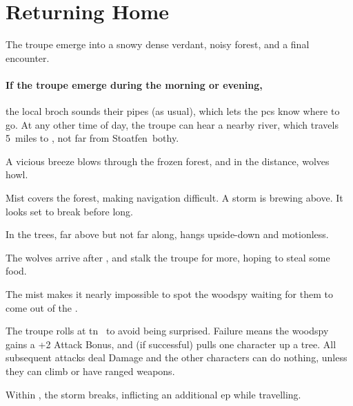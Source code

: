 \section{Returning Home}

\begin{multicols}{2}
\renewcommand\npcsymbol{\gls{evening}}

\noindent
The troupe emerge into a
\ifcase\value{temperature}%
  snowy
\or%
  dense 
\else%
  verdant, noisy 
\fi%
forest, and a final encounter.

\paragraph{If the troupe emerge during the morning or evening,}
the local \gls{broch} sounds their pipes (as usual), which lets the \glspl{pc} know where to go.
At any other time of day, the troupe can hear a nearby river, which travels 5~miles to , not far from Stoatfen~\Gls{bothy}.

\begin{boxtext}
  \ifcase\value{temperature}
    A vicious breeze blows through the frozen forest, and in the distance, wolves howl.

    \or
    Mist covers the forest, making navigation difficult.
    \else
    A storm is brewing above.
    It looks set to break before long.

    In the trees, far above but not far along,  hangs upside-down and motionless.

  \fi
\end{boxtext}

\ifcase\value{temperature}
  The wolves arrive after , and stalk the troupe for  more, hoping to steal some food.

  \wolf
  \or
  The mist makes it nearly impossible to spot the \gls{woodspy} waiting for them to come out of the .

  \woodspy

  \addtocounter{tn}{\value{Dexterity}}
  \addtocounter{tn}{\value{Stealth}}
  The troupe rolls  at \gls{tn}~ to avoid being surprised.
  Failure means the \gls{woodspy} gains a +2 Attack Bonus, and (if successful) pulls one character up a tree.
  All subsequent attacks deal Damage and the other characters can do nothing, unless they can climb or have ranged weapons.

  \else
  Within , the storm breaks, inflicting an additional \gls{ep} while travelling.


\end{multicols}
